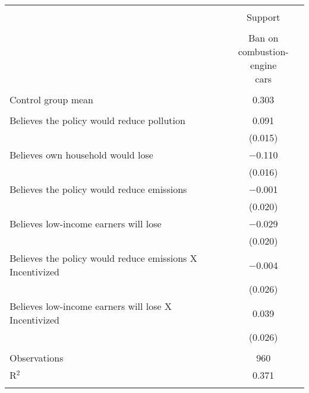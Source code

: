 
\begin{tabular}{@{\extracolsep{5pt}}lc} 
\\[-1.8ex]\hline 
\hline \\[-1.8ex] 
 & \multicolumn{1}{c}{Support} \\ 
\cline{2-2} 
\\[-1.8ex] & \makecell{Ban on\\combustion-engine\\cars} \\ 
\hline \\[-1.8ex] 
Control group mean & 0.303  \\ \hline \\[-1.8ex]
 Believes the policy would reduce pollution & 0.091 \\ 
  & (0.015) \\ 
  Believes own household would lose & $-$0.110 \\ 
  & (0.016) \\ 
  Believes the policy would reduce emissions & $-$0.001 \\ 
  & (0.020) \\ 
  Believes low-income earners will lose & $-$0.029 \\ 
  & (0.020) \\ 
  Believes the policy would reduce emissions X Incentivized & $-$0.004 \\ 
  & (0.026) \\ 
  Believes low-income earners will lose X Incentivized & 0.039 \\ 
  & (0.026) \\ 
 \hline \\[-1.8ex] 

Observations & 960 \\ 
R$^{2}$ & 0.371 \\ 
\hline 
\hline \\[-1.8ex] 
\end{tabular} 